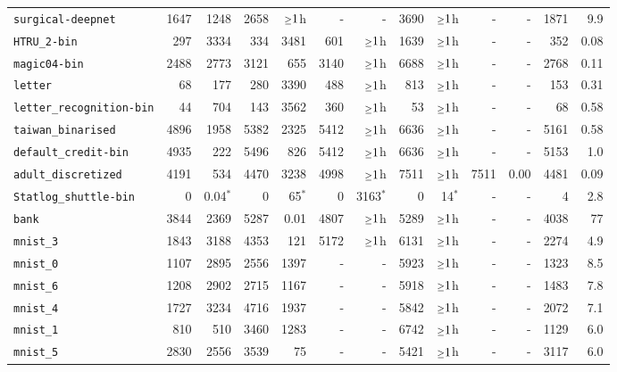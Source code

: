 \begin{tabular}{lrrrrrrrrrrrr}
\texttt{surgical-deepnet} & 1647 & 1248 & 2658 & $\mathsmaller{\geq}1$h & - & - & 3690 & $\mathsmaller{\geq}1$h & - & - & 1871 & 9.9\\
\texttt{HTRU\_2-bin} & 297 & 3334 & 334 & 3481 & 601 & $\mathsmaller{\geq}1$h & 1639 & $\mathsmaller{\geq}1$h & - & - & 352 & 0.08\\
\texttt{magic04-bin} & 2488 & 2773 & 3121 & 655 & 3140 & $\mathsmaller{\geq}1$h & 6688 & $\mathsmaller{\geq}1$h & - & - & 2768 & 0.11\\
\texttt{letter} & 68 & 177 & 280 & 3390 & 488 & $\mathsmaller{\geq}1$h & 813 & $\mathsmaller{\geq}1$h & - & - & 153 & 0.31\\
\texttt{letter\_recognition-bin} & 44 & 704 & 143 & 3562 & 360 & $\mathsmaller{\geq}1$h & 53 & $\mathsmaller{\geq}1$h & - & - & 68 & 0.58\\
\texttt{taiwan\_binarised} & 4896 & 1958 & 5382 & 2325 & 5412 & $\mathsmaller{\geq}1$h & 6636 & $\mathsmaller{\geq}1$h & - & - & 5161 & 0.58\\
\texttt{default\_credit-bin} & 4935 & 222 & 5496 & 826 & 5412 & $\mathsmaller{\geq}1$h & 6636 & $\mathsmaller{\geq}1$h & - & - & 5153 & 1.0\\
\texttt{adult\_discretized} & 4191 & 534 & 4470 & 3238 & 4998 & $\mathsmaller{\geq}1$h & 7511 & $\mathsmaller{\geq}1$h & 7511 & 0.00 & 4481 & 0.09\\
\texttt{Statlog\_shuttle-bin} & 0 & 0.04$^*$ & 0 & 65$^*$ & 0 & 3163$^*$ & 0 & 14$^*$ & - & - & 4 & 2.8\\
\texttt{bank} & 3844 & 2369 & 5287 & 0.01 & 4807 & $\mathsmaller{\geq}1$h & 5289 & $\mathsmaller{\geq}1$h & - & - & 4038 & 77\\
\texttt{mnist\_3} & 1843 & 3188 & 4353 & 121 & 5172 & $\mathsmaller{\geq}1$h & 6131 & $\mathsmaller{\geq}1$h & - & - & 2274 & 4.9\\
\texttt{mnist\_0} & 1107 & 2895 & 2556 & 1397 & - & - & 5923 & $\mathsmaller{\geq}1$h & - & - & 1323 & 8.5\\
\texttt{mnist\_6} & 1208 & 2902 & 2715 & 1167 & - & - & 5918 & $\mathsmaller{\geq}1$h & - & - & 1483 & 7.8\\
\texttt{mnist\_4} & 1727 & 3234 & 4716 & 1937 & - & - & 5842 & $\mathsmaller{\geq}1$h & - & - & 2072 & 7.1\\
\texttt{mnist\_1} & 810 & 510 & 3460 & 1283 & - & - & 6742 & $\mathsmaller{\geq}1$h & - & - & 1129 & 6.0\\
\texttt{mnist\_5} & 2830 & 2556 & 3539 & 75 & - & - & 5421 & $\mathsmaller{\geq}1$h & - & - & 3117 & 6.0\\

\end{tabular}
